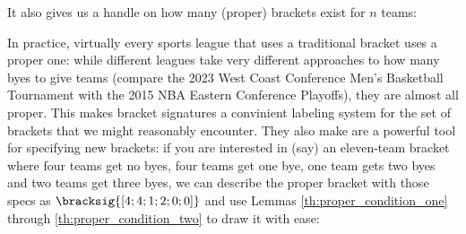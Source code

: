{It also gives us a handle on how many (proper) brackets exist for $n$ teams:


In practice, virtually every sports league that uses a traditional bracket uses a proper one: while different leagues take very different approaches to how many byes to give teams (compare the 2023 West Coast Conference Men's Basketball Tournament with the 2015 NBA Eastern Conference
Playoffs), they are almost all proper. This makes bracket signatures a convinient labeling system for the set of brackets that we might reasonably encounter. They also make are a powerful tool for specifying new brackets: if you are interested in (say) an eleven-team bracket where four teams get no byes, four teams get one bye, one team gets two byes and two teams get three byes, we can describe the proper bracket with those specs as $\bracksig{[4; 4; 1; 2; 0; 0]}$ and use Lemmas \ref{th:proper_condition_one} through \ref{th:proper_condition_two} to draw it with ease:

}